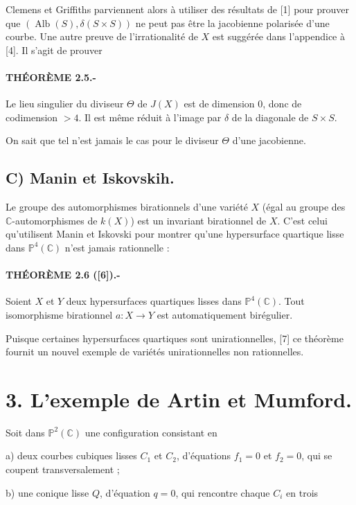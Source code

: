 \documentclass[10pt]{article}
\newcommand{\C}{\mathbb C}
\newcommand{\PP}{\mathbb P}
\newcommand{\Alb}{\operatorname{Alb}}
\begin{document}
\newpage
Clemens et Griffiths parviennent alors à utiliser des résultats de [1] pour prouver que \((\Alb(S),\delta(S\times S))\) ne peut pas être la jacobienne polarisée d'une courbe. Une autre preuve de l'irrationalité de \(X\) est suggérée dans l'appendice à [4]. Il s'agit de prouver

\paragraph{THÉORÈME 2.5.-} Le lieu singulier du diviseur \(\Theta\) de \(J(X)\) est de dimension \(0\), donc de codimension \(>4\). Il est même réduit à l'image par \(\delta\) de la diagonale de \(S\times S\).

On sait que tel n'est jamais le cas pour le diviseur \(\Theta\) d'une jacobienne.

\subsection*{C) Manin et Iskovskih.}

Le groupe des automorphismes birationnels d'une variété \(X\) (égal au groupe des \(\C\)-automorphismes de \(k(X)\)) est un invariant birationnel de \(X\). C'est celui qu'utilisent Manin et Iskovski pour montrer qu'une hypersurface quartique lisse dans \(\PP^4(\C)\) n'est jamais rationnelle :

\paragraph{THÉORÈME 2.6 ([6]).-} Soient \(X\) et \(Y\) deux hypersurfaces quartiques lisses dans \(\PP^4(\C)\). Tout isomorphisme birationnel \(a:X\longrightarrow Y\) est automatiquement birégulier.

Puisque certaines hypersurfaces quartiques sont unirationnelles, [7] ce théorème fournit un nouvel exemple de variétés unirationnelles non rationnelles.

\section*{3. L'exemple de Artin et Mumford.}

Soit dans \(\PP^2(\C)\) une configuration consistant en

\noindent a) deux courbes cubiques lisses \(C_1\) et \(C_2\), d'équations \(f_1=0\) et \(f_2=0\), qui se coupent transversalement ;

\noindent b) une conique lisse \(Q\), d'équation \(q=0\), qui rencontre chaque \(C_i\) en trois
\end{document}
